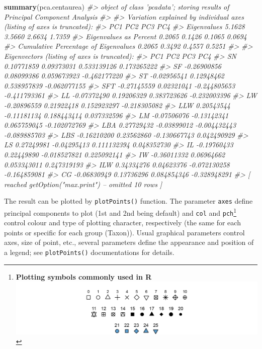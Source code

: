 \documentclass[
]{article}
\newenvironment{Shaded}{\begin{snugshade}}{\end{snugshade}}
\newcommand{\CommentTok}[1]{\textcolor[rgb]{0.56,0.35,0.01}{\textit{#1}}}
\newcommand{\KeywordTok}[1]{\textcolor[rgb]{0.13,0.29,0.53}{\textbf{#1}}}
\newcommand{\NormalTok}[1]{#1}
\begin{document}
\begin{Shaded}
\begin{Highlighting}[]
\KeywordTok{summary}\NormalTok{(pca.centaurea)}
\CommentTok{#> object of class 'pcadata'; storing results of Principal Component Analysis}
\CommentTok{#> }
\CommentTok{#> Variation explained by individual axes (listing of axes is truncated):}
\CommentTok{#>                                         PC1    PC2    PC3    PC4}
\CommentTok{#> Eigenvalues                          5.1628 3.5660 2.6634 1.7359}
\CommentTok{#> Eigenvalues as Percent               0.2065 0.1426 0.1065 0.0694}
\CommentTok{#> Cumulative Percentage of Eigenvalues 0.2065 0.3492 0.4557 0.5251}
\CommentTok{#> }
\CommentTok{#> Eigenvectors (listing of axes is truncated):}
\CommentTok{#>             PC1         PC2          PC3          PC4}
\CommentTok{#> SN   0.10771859  0.09373031  0.533139126  0.173265222}
\CommentTok{#> SF  -0.26900856  0.08099386  0.059673923 -0.462177220}
\CommentTok{#> ST  -0.02956541  0.12948462  0.538957839 -0.062077155}
\CommentTok{#> SFT -0.27145559  0.02321041 -0.244805653 -0.411793361}
\CommentTok{#> LL  -0.07372490  0.19206329  0.383723626 -0.232003396}
\CommentTok{#> LW  -0.20896559  0.21922418  0.152923297 -0.218305082}
\CommentTok{#> LLW  0.20543544 -0.11181134  0.188443414  0.037332596}
\CommentTok{#> LM  -0.07506076 -0.13142341  0.065759045 -0.102072769}
\CommentTok{#> LBA  0.27729432 -0.03899012 -0.004432443 -0.089885703}
\CommentTok{#> LBS -0.16210200  0.23562860 -0.130667743  0.042490929}
\CommentTok{#> LS   0.27249981 -0.04295413  0.111132394  0.048352730}
\CommentTok{#> IL  -0.19760433  0.22449890 -0.018527821  0.225092141}
\CommentTok{#> IW  -0.36011332  0.06964662  0.053343011  0.247319193}
\CommentTok{#> ILW  0.34334276  0.04623376 -0.072130258 -0.164859081}
\CommentTok{#> CG  -0.06830949  0.13736296  0.084854346 -0.328948291}
\CommentTok{#>  [ reached getOption("max.print") -- omitted 10 rows ]}
\end{Highlighting}
\end{Shaded}

The result can be plotted by \texttt{plotPoints()} function. The
parameter \texttt{axes} define principal components to plot (1st and 2nd
being default) and \texttt{col} and \texttt{pch}\footnote{\textbf{Plotting
  symbols commonly used in R}\\
  \includegraphics[width=1\textwidth,height=\textheight]{./pch.png}}
control colour and type of plotting character, respectively (the same
for each points or specific for each group (Taxon)). Usual graphical
parameters control axes, size of point, etc., several parameters define
the appearance and position of a legend; see \texttt{plotPoints()}
documentations for details.
\end{document}
